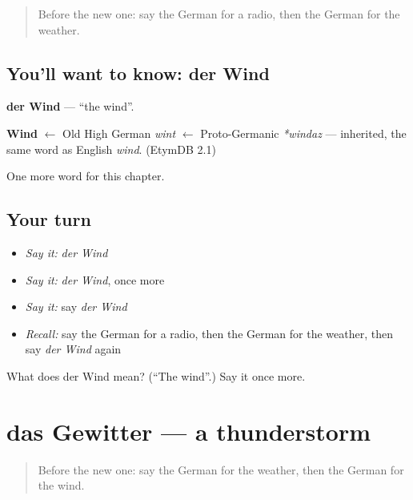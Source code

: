 \label{lesson:GE-C162-wind}



\begin{quote}
Before the new one: say the German for a radio, then the German for the weather.
\end{quote}

\subsection*{You'll want to know: der Wind}
\textbf{der Wind} — \textquotedblleft{}the wind\textquotedblright{}.

\begin{cousinweb}
\textbf{Wind} $\leftarrow$ Old High German \emph{wint} $\leftarrow$ Proto-Germanic \emph{*windaz} — inherited, the same word as English \emph{wind}. (EtymDB 2.1)
\end{cousinweb}

\begin{grammarlens}[title={What you've built}]
One more word for this chapter.
\end{grammarlens}

\subsection*{Your turn}
\begin{itemize}
\raggedright
  \item \emph{Say it:} \emph{der Wind}
  \item \emph{Say it:} \emph{der Wind}, once more
  \item \emph{Say it:} say \emph{der Wind}
  \item \emph{Recall:} say the German for a radio, then the German for the weather, then say \emph{der Wind} again
\end{itemize}

\begin{tcolorbox}[breakable,colback=teal!4,colframe=teal!35!black,title={Before you move on}]
What does der Wind mean? (\textquotedblleft{}The wind\textquotedblright{}.) Say it once more.
\end{tcolorbox}
\section[das Gewitter]{das Gewitter — a thunderstorm}

\label{lesson:GE-C162-gewitter}



\begin{quote}
Before the new one: say the German for the weather, then the German for the wind.
\end{quote}

